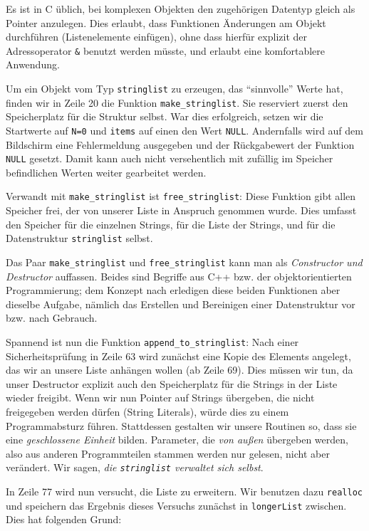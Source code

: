 Es ist in C üblich, bei komplexen Objekten den zugehörigen Datentyp gleich als Pointer anzulegen. Dies erlaubt, dass Funktionen Änderungen am Objekt durchführen (\eg Listenelemente einfügen), ohne dass hierfür explizit der Adressoperator \texttt{\&} benutzt werden müsste, und erlaubt eine komfortablere Anwendung.

Um ein Objekt vom Typ \texttt{stringlist} zu erzeugen, das \enquote{sinnvolle} Werte hat, finden wir in Zeile 20 die Funktion \texttt{make\_stringlist}. Sie reserviert zuerst den Speicherplatz für die Struktur selbst. War dies erfolgreich, setzen wir die Startwerte auf \texttt{N=0} und \texttt{items} auf einen den Wert \texttt{NULL}. Andernfalls wird auf dem Bildschirm eine Fehlermeldung ausgegeben und der Rückgabewert der Funktion \texttt{NULL} gesetzt. Damit kann auch nicht versehentlich mit zufällig im Speicher befindlichen Werten weiter gearbeitet werden.

Verwandt mit \texttt{make\_stringlist} ist \texttt{free\_stringlist}: Diese Funktion gibt allen Speicher frei, der von unserer Liste in Anspruch genommen wurde. Dies umfasst den Speicher für die einzelnen Strings, für die Liste der Strings, und für die Datenstruktur \texttt{stringlist} selbst.

Das Paar \texttt{make\_stringlist} und \texttt{free\_stringlist} kann man als \emph{Constructor und Destructor} auffassen. Beides sind Begriffe aus C++ bzw. der objektorientierten Programmierung; dem Konzept nach erledigen diese beiden Funktionen aber dieselbe Aufgabe, nämlich das Erstellen und Bereinigen einer Datenstruktur vor bzw. nach Gebrauch.

Spannend ist nun die Funktion \texttt{append\_to\_stringlist}: Nach einer Sicherheitsprüfung in Zeile 63 wird zunächst eine Kopie des Elements angelegt, das wir an unsere Liste anhängen wollen (ab Zeile 69). Dies müssen wir tun, da unser Destructor explizit auch den Speicherplatz für die Strings in der Liste wieder freigibt. Wenn wir nun Pointer auf Strings übergeben, die nicht freigegeben werden dürfen (\eg String Literals), würde dies zu einem Programmabsturz führen. Stattdessen gestalten wir unsere Routinen so, dass sie eine \emph{geschlossene Einheit} bilden. Parameter, die \emph{von außen} übergeben werden, also aus anderen Programmteilen stammen werden nur gelesen, nicht aber verändert. Wir sagen, \emph{die \texttt{stringlist} verwaltet sich selbst}.

In Zeile 77 wird nun versucht, die Liste zu erweitern. Wir benutzen dazu \texttt{realloc} und speichern das Ergebnis dieses Versuchs zunächst in \texttt{longerList} zwischen. Dies hat folgenden Grund:

